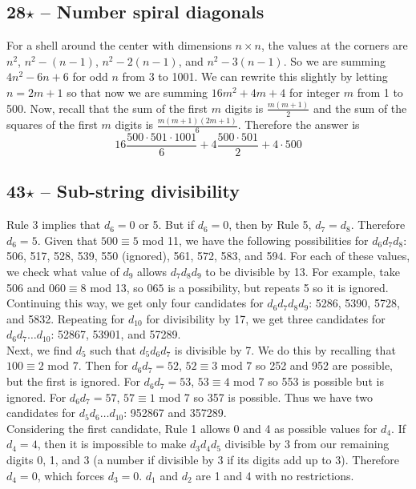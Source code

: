 \documentclass{article}
\begin{document}
\subsection*{28$\star$ -- Number spiral diagonals} 
For a shell around the center with dimensions $n \times n$, the values at the corners are $n^2$, $n^2 - (n-1)$, $n^2 - 2(n-1)$, and $n^2 - 3(n-1)$. 
So we are summing $4n^2 - 6n + 6$ for odd $n$ from 3 to 1001. 
We can rewrite this slightly by letting $n = 2m+1$ so that now we are summing $16m^2 + 4m + 4$ for integer $m$ from 1 to 500. 
Now, recall that the sum of the first $m$ digits is $\frac{m(m+1)}{2}$ and the sum of the squares of the first $m$ digits is $\frac{m(m+1)(2m+1)}{6}$. 
Therefore the answer is 
\[ \boxed{ 16 \frac{500 \cdot 501 \cdot 1001}{6} + 4 \frac{500 \cdot 501}{2} + 4 \cdot 500 } \]

\subsection*{43$\star$ -- Sub-string divisibility} 
Rule 3 implies that $d_6 = 0$ or 5. 
But if $d_6=0$, then by Rule 5, $d_7=d_8$. 
Therefore $d_6 = 5$. 
Given that $500 \equiv 5$ mod 11, we have the following possibilities for $d_6d_7d_8$: 506, 517, 528, 539, 550 (ignored), 561, 572, 583, and 594. 
For each of these values, we check what value of $d_9$ allows $d_7d_8d_9$ to be divisible by 13. 
For example, take 506 and $060 \equiv 8$ mod 13, so $065$ is a possibility, but repeats 5 so it is ignored. 
Continuing this way, we get only four candidates for $d_6d_7d_8d_9$: 5286, 5390, 5728, and 5832. 
Repeating for $d_{10}$ for divisibility by 17, we get three candidates for $d_6d_7\dotsc d_{10}$: 52867, 53901, and 57289. \\

Next, we find $d_5$ such that $d_5d_6d_7$ is divisible by 7. 
We do this by recalling that $100 \equiv 2$ mod 7. 
Then for $d_6d_7 = 52$, $52 \equiv 3$ mod 7 so 252 and 952 are possible, but the first is ignored. 
For $d_6d_7 = 53$, $53 \equiv 4$ mod 7 so 553 is possible but is ignored. 
For $d_6d_7=57$, $57 \equiv 1$ mod 7 so 357 is possible. 
Thus we have two candidates for $d_5d_6\dotsc d_{10}$: 952867 and 357289. \\

Considering the first candidate, Rule 1 allows 0 and 4 as possible values for $d_4$. 
If $d_4 = 4$, then it is impossible to make $d_3d_4d_5$ divisible by 3 from our remaining digits 0, 1, and 3 (a number if divisible by 3 if its digits add up to 3). 
Therefore $d_4 = 0$, which forces $d_3=0$. 
$d_1$ and $d_2$ are 1 and 4 with no restrictions. \\
\end{document}
